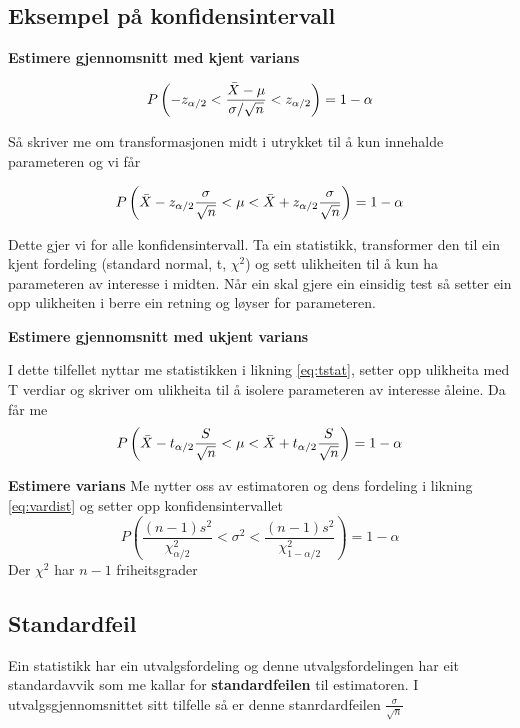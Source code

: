 \subsection{Eksempel på konfidensintervall}

\textbf{Estimere gjennomsnitt med kjent varians}

\begin{equation}
    P\left(-z_{\alpha/2} < \frac{\Bar{X} - \mu}{\sigma / \sqrt{n}} < z_{\alpha/2}\right) = 1 - \alpha
\end{equation}

Så skriver me om transformasjonen midt i utrykket til å kun innehalde parameteren og vi får

\begin{equation}
        P\left(\Bar{X} - z_{\alpha/2}\frac{\sigma}{\sqrt{n}} < \mu < \Bar{X} + z_{\alpha/2}\frac{\sigma}{\sqrt{n}} \right) = 1 - \alpha
\end{equation}

Dette gjer vi for alle konfidensintervall. Ta ein statistikk, transformer den til ein kjent fordeling (standard normal, t, $\chi^2$) og sett ulikheiten til å kun ha parameteren av interesse i midten. Når ein skal gjere ein einsidig test så setter ein opp ulikheiten i berre ein retning og løyser for parameteren.

\textbf{Estimere gjennomsnitt med ukjent varians}

I dette tilfellet nyttar me statistikken i likning \ref{eq:tstat}, setter opp ulikheita med T verdiar og skriver om ulikheita til å isolere parameteren av interesse åleine. Da får me
\begin{equation}
    P\left(\Bar{X} - t_{\alpha/2}\frac{S}{\sqrt{n}} < \mu < \Bar{X} + t_{\alpha/2}\frac{S}{\sqrt{n}} \right) = 1 - \alpha
\end{equation}

\textbf{Estimere varians}
Me nytter oss av estimatoren og dens fordeling i likning \ref{eq:vardist} og setter opp konfidensintervallet
\begin{equation}
    P\left( \frac{(n-1)s^2}{\chi^2_{\alpha/2}} < \sigma^2 < \frac{(n-1)s^2}{\chi^2_{1 - \alpha/2}} \right) = 1 - \alpha
\end{equation}
Der $\chi^2$ har $n - 1$ friheitsgrader

\subsection{Standardfeil}
Ein statistikk har ein utvalgsfordeling og denne utvalgsfordelingen har eit standardavvik som me kallar for \textbf{standardfeilen} til estimatoren. I utvalgsgjennomsnittet sitt tilfelle så er denne stanrdardfeilen $\frac{\sigma}{\sqrt{n}}$

